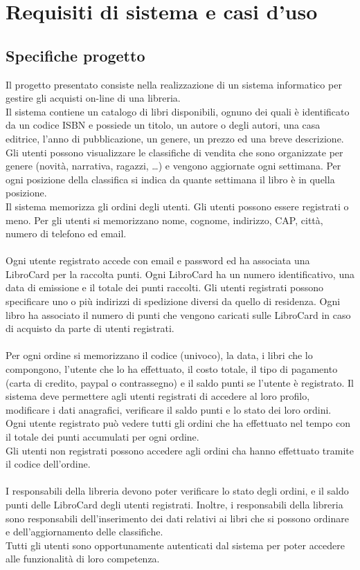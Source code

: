 \documentclass[a4paper,11pt]{report}
\begin{document}
\tableofcontents
\chapter{Requisiti di sistema e casi d'uso}
\section{Specifiche progetto}
Il progetto presentato consiste nella realizzazione di un sistema informatico per gestire gli acquisti on-line di una libreria.\\
Il sistema contiene un catalogo di libri disponibili, ognuno dei quali è identificato da un codice ISBN e possiede un titolo, un autore o degli autori, una casa editrice, l’anno di pubblicazione, un genere, un prezzo ed una breve descrizione. 
\\
Gli utenti possono visualizzare le classifiche di vendita che sono organizzate per genere (novità, narrativa, ragazzi, …) e vengono aggiornate ogni settimana. Per ogni posizione della classifica si indica da quante
settimana il libro è in quella posizione.\\
Il sistema memorizza gli ordini degli utenti. Gli utenti possono essere registrati o meno. Per gli
utenti si memorizzano nome, cognome, indirizzo, CAP, città, numero di telefono ed email.\\
\\
Ogni utente registrato accede con email e password ed ha associata una LibroCard per la raccolta punti.
Ogni LibroCard ha un numero identificativo, una data di emissione e il totale dei punti raccolti. Gli
utenti registrati possono specificare uno o più indirizzi di spedizione diversi da quello di residenza.
Ogni libro ha associato il numero di punti che vengono caricati sulle LibroCard in caso di acquisto
da parte di utenti registrati.\\
\\
Per ogni ordine si memorizzano il codice (univoco), la data, i libri che lo compongono, l’utente che
lo ha effettuato, il costo totale, il tipo di pagamento (carta di credito, paypal o contrassegno) e il
saldo punti se l’utente è registrato.
Il sistema deve permettere agli utenti registrati di accedere al loro profilo, modificare i dati
anagrafici, verificare il saldo punti e lo stato dei loro ordini. Ogni utente registrato può vedere tutti
gli ordini che ha effettuato nel tempo con il totale dei punti accumulati per ogni ordine.\\
Gli utenti non registrati possono accedere agli ordini cha hanno effettuato tramite il codice
dell’ordine.\\
\\
I responsabili della libreria devono poter verificare lo stato degli ordini, e il saldo punti delle
LibroCard degli utenti registrati.
Inoltre, i responsabili della libreria sono responsabili dell’inserimento dei dati relativi ai libri che si
possono ordinare e dell’aggiornamento delle classifiche.\\
Tutti gli utenti sono opportunamente autenticati dal sistema per poter accedere alle funzionalità
di loro competenza.
\end{document}
